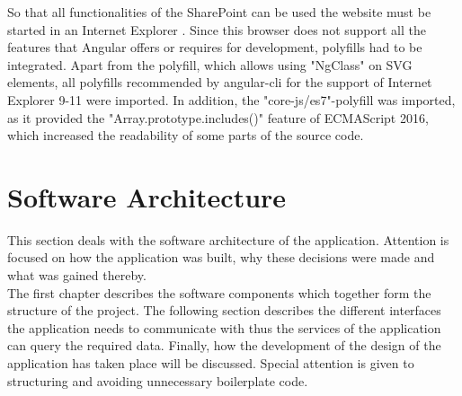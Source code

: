 \documentclass[Bachelor,BIF,english]{twbook}
\begin{document}
So that all functionalities of the SharePoint can be used the website must be started in an Internet Explorer \cite{IE}. Since this browser does not support all the features that Angular offers or requires for development, polyfills had to be integrated. Apart from the polyfill, which allows using "NgClass" on SVG elements, all polyfills recommended by angular-cli for the support of Internet Explorer 9-11 were imported. In addition, the "core-js/es7"-polyfill was imported, as it provided the "Array.prototype.includes()" feature of ECMAScript 2016, which increased the readability of some parts of the source code.


\section{Software Architecture}
This section deals with the software architecture of the application. Attention is focused on how the application was built, why these decisions were made and what was gained thereby.
\\[\baselineskip]
The first chapter describes the software components which together form the structure of the project. The following section describes the different interfaces the application needs to communicate with thus the services of the application can query the required data. Finally, how the development of the design of the application has taken place will be discussed. Special attention is given to structuring and avoiding unnecessary boilerplate code.
\end{document}

